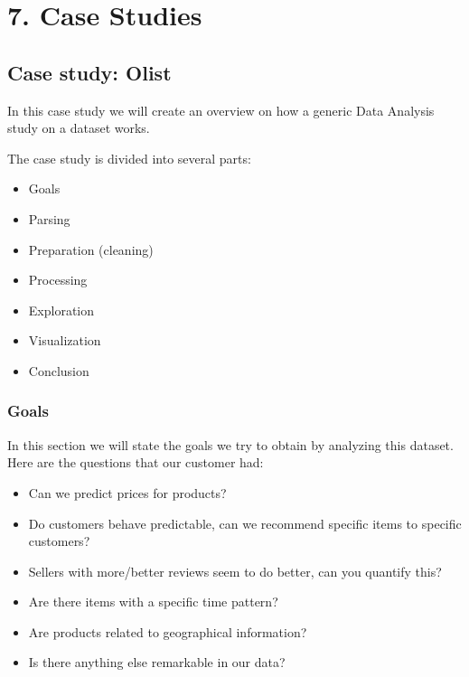 \documentclass[letterpaper,10pt,english]{jupyterBook}
\begin{document}
\part{7. Case Studies}


\chapter{Case study: Olist}
\label{\detokenize{c7_case_studies/Olist:case-study-olist}}\label{\detokenize{c7_case_studies/Olist::doc}}
\sphinxAtStartPar
In this case study we will create an overview on how a generic Data Analysis study on a dataset works.

\sphinxAtStartPar
The case study is divided into several parts:
\begin{itemize}
\item {} 
\sphinxAtStartPar
Goals

\item {} 
\sphinxAtStartPar
Parsing

\item {} 
\sphinxAtStartPar
Preparation (cleaning)

\item {} 
\sphinxAtStartPar
Processing

\item {} 
\sphinxAtStartPar
Exploration

\item {} 
\sphinxAtStartPar
Visualization

\item {} 
\sphinxAtStartPar
Conclusion

\end{itemize}


\section{Goals}
\label{\detokenize{c7_case_studies/Olist:goals}}
\sphinxAtStartPar
In this section we will state the goals we try to obtain by analyzing this dataset. Here are the questions that our customer had:
\begin{itemize}
\item {} 
\sphinxAtStartPar
Can we predict prices for products?

\item {} 
\sphinxAtStartPar
Do customers behave predictable, can we recommend specific items to specific customers?

\item {} 
\sphinxAtStartPar
Sellers with more/better reviews seem to do better, can you quantify this?

\item {} 
\sphinxAtStartPar
Are there items with a specific time pattern?

\item {} 
\sphinxAtStartPar
Are products related to geographical information?

\item {} 
\sphinxAtStartPar
Is there anything else remarkable in our data?

\end{itemize}
\end{document}
